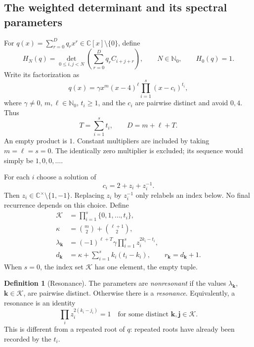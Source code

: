 \documentclass[11pt,a4paper]{article}
\numberwithin{equation}{section}
\theoremstyle{definition}
\newtheorem{definition}[theorem]{Definition}
\theoremstyle{remark}
\newcommand{\NN}{\mathbb N_0}
\newcommand{\CC}{\mathbb C}
\newcommand{\bk}{\boldsymbol{k}}
\newcommand{\bj}{\boldsymbol{j}}
\begin{document}
\subsection{The weighted determinant and its spectral parameters}
For $q(x)=\sum_{r=0}^{D}q_rx^r\in\CC[x]\setminus\{0\}$, define
\begin{equation}\label{rc:eq:HN}
 H_N(q)=\det_{0\le i,j<N}\left(\sum_{r=0}^{D}q_r C_{i+j+r}\right),
 \qquad N\in\NN,\qquad H_0(q)=1.
\end{equation}
Write its factorization as
\begin{equation}\label{rc:eq:qfactor}
 q(x)=\gamma x^m(x-4)^\ell\prod_{i=1}^{s}(x-c_i)^{t_i},
\end{equation}
where $\gamma\ne0$, $m,\ell\in\NN$, $t_i\ge1$, and the $c_i$ are pairwise
distinct and avoid $0,4$.  Thus
\[
 T=\sum_{i=1}^{s}t_i,\qquad D=m+\ell+T.
\]
An empty product is $1$.  Constant multipliers are included by taking
$m=\ell=s=0$.  The identically zero multiplier is excluded; its sequence
would simply be $1,0,0,\ldots$.

For each $i$ choose a solution of
\begin{equation}\label{rc:eq:spectral}
 c_i=2+z_i+z_i^{-1}.
\end{equation}
Then $z_i\in\CC^\times\setminus\{1,-1\}$.  Replacing $z_i$ by $z_i^{-1}$
only relabels an index below.  No final recurrence depends on this choice.
Define
\begin{align}
 \mathcal K&=\prod_{i=1}^{s}\{0,1,\ldots,t_i\},\label{rc:eq:Kset}\\
 \kappa&=\binom m2+\binom{\ell+1}2,\label{rc:eq:kappa}\\
 \lambda_{\bk}&=(-1)^{\ell+T}\gamma
                       \prod_{i=1}^{s}z_i^{2k_i-t_i},\label{rc:eq:lambda}\\
 d_{\bk}&=\kappa+\sum_{i=1}^{s}k_i(t_i-k_i),
 \qquad r_{\bk}=d_{\bk}+1.\label{rc:eq:degree}
\end{align}
When $s=0$, the index set $\mathcal K$ has one element, the empty tuple.

\begin{definition}[Resonance]
The parameters are \emph{nonresonant} if the values
$\lambda_{\bk}$, $\bk\in\mathcal K$, are pairwise distinct.
Otherwise there is a \emph{resonance}.  Equivalently, a resonance is an
identity
\begin{equation}\label{rc:eq:resonance}
 \prod_i z_i^{2(k_i-j_i)}=1
 \quad\text{for some distinct }\bk,\bj\in\mathcal K.
\end{equation}
This is different from a repeated root of $q$: repeated roots have already
been recorded by the $t_i$.
\end{definition}
\end{document}
